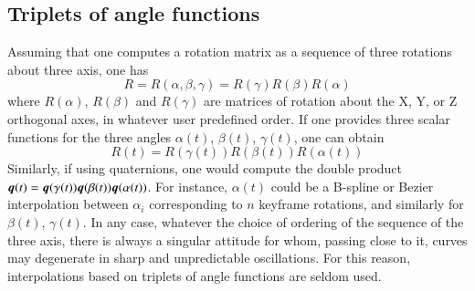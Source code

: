 \subsection{Triplets of angle functions}
Assuming that one computes a rotation matrix as a sequence of three rotations about three axis, one has
\begin{equation}
    R = R(\alpha,\beta,\gamma) = R(\gamma) R(\beta) R(\alpha)
\end{equation}
where $R(\alpha)$, $R(\beta)$ and $R(\gamma)$ are matrices of rotation about the X, Y, or Z orthogonal axes, in whatever user predefined order. 
If one provides three scalar functions for the three angles $\alpha(t)$, $\beta(t)$, $\gamma(t)$, one can obtain 
\begin{equation}
    R(t) = R(\gamma(t)) R(\beta(t)) R(\alpha(t))
\end{equation}
Similarly, if using quaternions, one would compute the double product
${\boldsymbol{q}}(t)={\boldsymbol{q}}(\gamma(t)){\boldsymbol{q}}(\beta(t)){\boldsymbol{q}}(\alpha(t))$. For instance, $\alpha(t)$ could be a B-spline or Bezier interpolation between $\alpha_i$ corresponding to $n$ keyframe rotations, and similarly for $\beta(t)$, $\gamma(t)$.
In any case, whatever the choice of ordering of the sequence of the three axis, there is always a singular attitude for whom, passing close to it, curves may degenerate in sharp and unpredictable oscillations. For this reason, interpolations based on triplets of angle functions are seldom used. 

